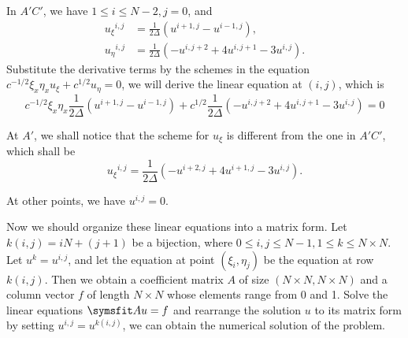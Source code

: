 \documentclass{assignment}[2019/10/15]
\newcommand{\lr}[3]{\left#1#3\right#2}
\newcommand{\ux}{{u_\xi}}
\newcommand{\ue}{{u_\eta}}
\begin{document}
    In $A'C'$, we have $1\leq i \leq N-2, j = 0$, and
    \begin{equation}
        \begin{aligned}
            \ux^{i, j} &= \frac{1}{2\Delta}\lr(){u^{i+1, j}-u^{i-1, j}},\\
            \ue^{i, j} &= \frac{1}{2\Delta}\lr(){-u^{i, j+2}+4u^{i, j+1}-3u^{i, j}}.
        \end{aligned}
    \end{equation}
    Substitute the derivative terms by the schemes in the equation $c^{-1/2}\xi_x\eta_x\ux+c^{1/2}\ue=0$, we will derive the linear equation at $(i, j)$, which is
    \begin{equation}
        c^{-1/2}\xi_x\eta_x\frac{1}{2\Delta}\lr(){u^{i+1, j}-u^{i-1, j}}+c^{1/2}\frac{1}{2\Delta}\lr(){-u^{i, j+2}+4u^{i, j+1}-3u^{i, j}}=0
    \end{equation}

    At $A'$, we shall notice that the scheme for $\ux$ is different from the one in $A'C'$, which shall be
    \begin{equation}
        \ux^{i, j} = \frac{1}{2\Delta}\lr(){-u^{i+2, j}+4u^{i+1, j}-3u^{i, j}}.
    \end{equation}

    At other points, we have $u^{i, j} = 0$.

    Now we should organize these linear equations into a matrix form. Let $k(i, j) = iN + (j + 1)$ be a bijection, where $0\leq i, j\leq N-1, 1\leq k\leq N\times N$. Let $u^k = u^{i, j}$, and let the equation at point $(\xi_i, \eta_j)$ be the equation at row $k(i, j)$. Then we obtain a coefficient matrix $A$ of size $(N\times N, N\times N)$ and a column vector $f$ of length $N\times N$ whose elements range from 0 and 1. Solve the linear equations $\matr{A}u=f$ and rearrange the solution $u$ to its matrix form by setting $u^{i, j} = u^{k(i, j)}$, we can obtain the numerical solution of the problem.
\end{document}

